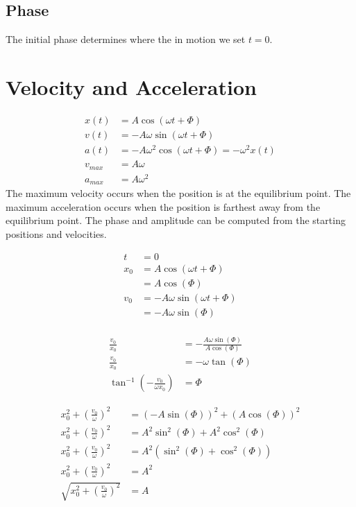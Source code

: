 \documentclass{article}
\theoremstyle{mytheoremstyle}
\theoremstyle{mytheoremstyle}
\theoremstyle{myproblemstyle}
\begin{document}
    \subsection*{Phase}
    The initial phase determines where the in motion we set $t=0$.

    \section*{Velocity and Acceleration}
    \begin{align*}
        x(t) &= A\cos(\omega t + \Phi) \\
        v(t) &= -A\omega\sin(\omega t + \Phi) \\
        a(t) &= -A\omega^2\cos(\omega t + \Phi) = -\omega^2x(t) \\
        v_{max} &= A\omega \\
        a_{max} &= A\omega^2
    \end{align*}
    The maximum velocity occurs when the position is at the equilibrium point.
    The maximum acceleration occurs when the position is farthest away from the
    equilibrium point. The phase and amplitude can be computed from the starting
    positions and velocities.

    \begin{align*}
        t   &= 0 \\
        x_0 &= A\cos(\omega t + \Phi) \\
            &= A\cos(\Phi) \\
        v_0 &= -A\omega\sin(\omega t + \Phi) \\
            &= -A\omega\sin(\Phi) \\
    \end{align*}

    \begin{align*}
        \frac{v_0}{x_0} &= -\frac{A\omega\sin(\Phi)}{A\cos(\Phi)} \\
        \frac{v_0}{x_0} &= -\omega\tan(\Phi) \\
        \tan^{-1}(-\frac{v_0}{\omega x_0}) &= \Phi
    \end{align*}

    \begin{align*}
        x_0^2+(\frac{v_0}{\omega})^2 &= (-A\sin(\Phi))^2 + (A\cos(\Phi))^2 \\
        x_0^2+(\frac{v_0}{\omega})^2 &= A^2\sin^2(\Phi) + A^2\cos^2(\Phi) \\
        x_0^2+(\frac{v_0}{\omega})^2 &= A^2(\sin^2(\Phi) + \cos^2(\Phi)) \\
        x_0^2+(\frac{v_0}{\omega})^2 &= A^2 \\
        \sqrt{x_0^2+(\frac{v_0}{\omega})^2} &= A
    \end{align*}
\end{document}
